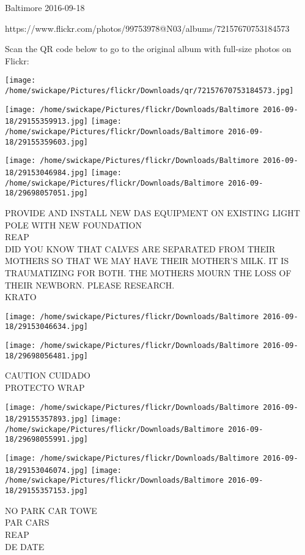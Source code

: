 \documentclass[10pt,letterpaper]{article}
\begin{document}
Baltimore 2016-09-18

https://www.flickr.com/photos/99753978@N03/albums/72157670753184573

Scan the QR code below to go to the original album with full-size photos on Flickr:

\texttt{[image: /home/swickape/Pictures/flickr/Downloads/qr/72157670753184573.jpg]}
\pagebreak

\texttt{[image: /home/swickape/Pictures/flickr/Downloads/Baltimore 2016-09-18/29155359913.jpg]}
\texttt{[image: /home/swickape/Pictures/flickr/Downloads/Baltimore 2016-09-18/29155359603.jpg]}

\texttt{[image: /home/swickape/Pictures/flickr/Downloads/Baltimore 2016-09-18/29153046984.jpg]}
\texttt{[image: /home/swickape/Pictures/flickr/Downloads/Baltimore 2016-09-18/29698057051.jpg]}

PROVIDE AND INSTALL NEW DAS EQUIPMENT ON EXISTING LIGHT POLE WITH NEW FOUNDATION\\
REAP\\
DID YOU KNOW THAT CALVES ARE SEPARATED FROM THEIR MOTHERS SO THAT WE MAY HAVE THEIR MOTHER'S MILK.  IT IS TRAUMATIZING FOR BOTH.  THE MOTHERS MOURN THE LOSS OF THEIR NEWBORN.  PLEASE RESEARCH.\\
KRATO\\
\pagebreak

\texttt{[image: /home/swickape/Pictures/flickr/Downloads/Baltimore 2016-09-18/29153046634.jpg]}

\vspace{0.25in}
\texttt{[image: /home/swickape/Pictures/flickr/Downloads/Baltimore 2016-09-18/29698056481.jpg]}

CAUTION CUIDADO\\
PROTECTO WRAP\\
\pagebreak

\texttt{[image: /home/swickape/Pictures/flickr/Downloads/Baltimore 2016-09-18/29155357893.jpg]}
\texttt{[image: /home/swickape/Pictures/flickr/Downloads/Baltimore 2016-09-18/29698055991.jpg]}

\texttt{[image: /home/swickape/Pictures/flickr/Downloads/Baltimore 2016-09-18/29153046074.jpg]}
\texttt{[image: /home/swickape/Pictures/flickr/Downloads/Baltimore 2016-09-18/29155357153.jpg]}

NO PARK CAR TOWE\\
PAR CARS\\
REAP\\
DE DATE\\
\pagebreak
\end{document}
